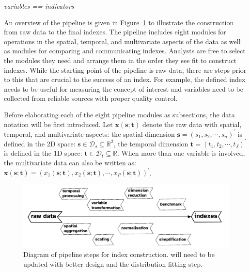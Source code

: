\documentclass[
]{article}
\begin{document}
\emph{variables == indicators}

An overview of the pipeline is given in Figure~\ref{fig-pipeline-steps}
to illustrate the construction from raw data to the final indexes. The
pipeline includes eight modules for operations in the spatial, temporal,
and multivariate aspects of the data as well as modules for comparing
and communicating indexes. Analysts are free to select the modules they
need and arrange them in the order they see fit to construct indexes.
While the starting point of the pipeline is raw data, there are steps
prior to this that are crucial to the success of an index. For example,
the defined index needs to be useful for measuring the concept of
interest and variables need to be collected from reliable sources with
proper quality control.

Before elaborating each of the eight pipeline modules as subsections,
the data notation will be first introduced. Let
\(\mathbf{x}(\mathbf{s};\mathbf{t})\) denote the raw data with spatial,
temporal, and multivariate aspects: the spatial dimension
\(\mathbf{s} = (s_1, s_2, \cdots, s_n)^\prime\) is defined in the 2D
space: \(\mathbf{s} \in \mathcal{D}_s \subseteq \mathbb{R}^2\), the
temporal dimension \(\mathbf{t} = (t_1, t_2, \cdots, t_J)^\prime\) is
defined in the 1D space:
\(\mathbf{t} \in \mathcal{D}_t \subseteq \mathbb{R}\). When more than
one variable is involved, the multivariate data can also be written as:
\(\mathbf{x}(\mathbf{s}; \mathbf{t}) = (x_1(\mathbf{s}; \mathbf{t}), x_2(\mathbf{s}; \mathbf{t}), \cdots, x_P(\mathbf{s}; \mathbf{t}))^\prime\).

\begin{figure}

{\centering \includegraphics[width=1\textwidth,height=0.9\textheight]{../figures/pipeline-steps.png}

}

\caption{\label{fig-pipeline-steps}Diagram of pipeline steps for index
construction. will need to be updated with better design and the
distribution fitting step.}

\end{figure}
\end{document}
